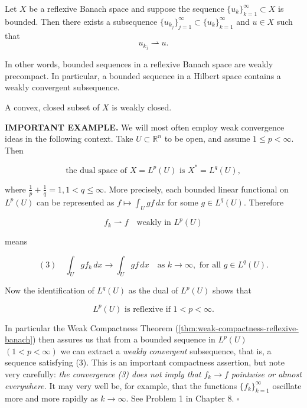 \begin{theorem}
\label{thm:weak-compactness-reflexive-banach}
Let $X$ be a reflexive Banach space and suppose the sequence $\{u_k\}_{k=1}^\infty \subset X$ is bounded. Then there exists a subsequence $\{u_{k_j}\}_{j=1}^\infty \subset \{u_k\}_{k=1}^\infty$ and $u \in X$ such that
$$u_{k_j} \rightharpoonup u.$$
\end{theorem}

In other words, bounded sequences in a reflexive Banach space are weakly precompact. In particular, a bounded sequence in a Hilbert space contains a weakly convergent subsequence.

\begin{theorem}
\label{thm:mazurs-theorem}
A convex, closed subset of $X$ is weakly closed.
\end{theorem}

\begin{example}
\label{ex:weak-convergence-lp-duality}
\textbf{IMPORTANT EXAMPLE.} We will most often employ weak convergence ideas in the following context. Take $U \subset \mathbb{R}^n$ to be open, and assume $1 \leq p < \infty$. Then

$$\text{the dual space of } X = L^p(U) \text{ is } X^* = L^q(U),$$

where $\frac{1}{p} + \frac{1}{q} = 1, 1 < q \leq \infty$. More precisely, each bounded linear functional on $L^p(U)$ can be represented as $f \mapsto \int_U gf \, dx$ for some $g \in L^q(U)$. Therefore

$$f_k \rightharpoonup f \quad \text{weakly in } L^p(U)$$

means

$$(3) \quad \int_U gf_k \, dx \to \int_U gf \, dx \quad \text{as } k \to \infty, \text{ for all } g \in L^q(U).$$

Now the identification of $L^q(U)$ as the dual of $L^p(U)$ shows that

$$L^p(U) \text{ is reflexive if } 1 < p < \infty.$$

In particular the Weak Compactness Theorem (\cref{thm:weak-compactness-reflexive-banach}) then assures us that from a bounded sequence in $L^p(U)$ $(1 < p < \infty)$ we can extract a \textit{weakly convergent} subsequence, that is, a sequence satisfying (3). This is an important compactness assertion, but note very carefully: \textit{the convergence (3) does not imply that $f_k \to f$ pointwise or almost everywhere.} It may very well be, for example, that the functions $\{f_k\}_{k=1}^\infty$ oscillate more and more rapidly as $k \to \infty$. See Problem 1 in Chapter 8. $\square$
\end{example}

